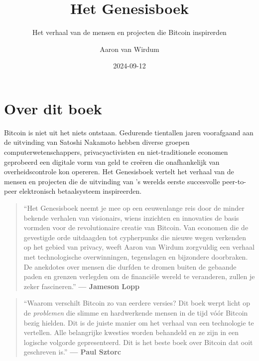 \documentclass[
  a5paper,
  smalldemyvopaper,11pt,twoside,onecolumn,openright,extrafontsizes]{memoir}
\title{Het Genesisboek}
\subtitle{Het verhaal van de mensen en projecten die Bitcoin
inspirerden}
\author{Aaron van Wirdum}
\date{2024-09-12}
\renewcommand*\contentsname{Table of contents}
\newcommand\contentsname{Table of contents}
\begin{document}
\frontmatter
\maketitle

\renewcommand*\contentsname{Table of contents}
{
\hypersetup{linkcolor=}
\setcounter{tocdepth}{2}
\tableofcontents
}

\mainmatter
{}

\chapter*{Over dit boek}\label{over-dit-boek}


Bitcoin is niet uit het niets ontstaan. Gedurende tientallen jaren
voorafgaand aan de uitvinding van Satoshi Nakamoto hebben diverse
groepen computerwetenschappers, privacyactivisten en niet-traditionele
economen geprobeerd een digitale vorm van geld te creëren die
onafhankelijk van overheidscontrole kon opereren. Het Genesisboek
vertelt het verhaal van de mensen en projecten die de uitvinding van 's
werelds eerste succesvolle peer-to-peer elektronisch betaalsysteem
inspireerden.

\begin{quote}
``Het Genesisboek neemt je mee op een eeuwenlange reis door de minder
bekende verhalen van visionairs, wiens inzichten en innovaties de basis
vormden voor de revolutionaire creatie van Bitcoin. Van economen die de
gevestigde orde uitdaagden tot cypherpunks die nieuwe wegen verkenden op
het gebied van privacy, weeft Aaron van Wirdum zorgvuldig een verhaal
met technologische overwinningen, tegenslagen en bijzondere doorbraken.
De anekdotes over mensen die durfden te dromen buiten de gebaande paden
en grenzen verlegden om de financiële wereld te veranderen, zullen je
zeker fascineren.'' \textbf{--- Jameson Lopp}
\end{quote}

\begin{quote}
``Waarom verschilt Bitcoin zo van eerdere versies? Dit boek werpt licht
op de \emph{problemen} die slimme en hardwerkende mensen in de tijd vóór
Bitcoin bezig hielden. Dit is de juiste manier om het verhaal van een
technologie te vertellen. Alle belangrijke kwesties worden behandeld en
ze zijn in een logische volgorde gepresenteerd. Dit is het beste boek
over Bitcoin dat ooit geschreven is.'' \textbf{--- Paul Sztorc}
\end{quote}
\end{document}
